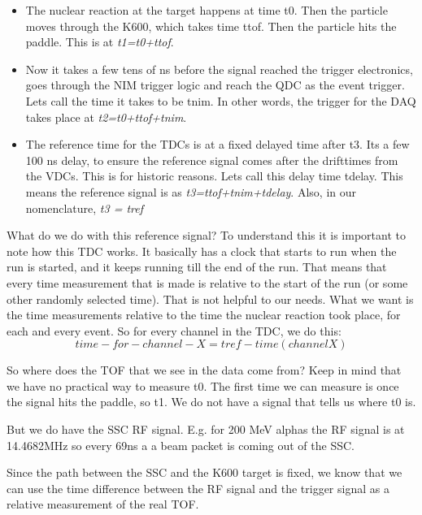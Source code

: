 \documentclass[11pt]{report}
\begin{document}
\begin{itemize}
\item
The nuclear reaction at the target happens at time t0.
Then the particle moves through the K600, which takes time ttof.
Then the particle hits the paddle. This is at 
{\it t1=t0+ttof}.

\item
Now it takes a few tens of ns before the signal reached the trigger
electronics, goes through the NIM trigger logic and reach the QDC as
the event trigger. Lets call the time it takes to be tnim.
In other words, the trigger for the DAQ takes place at
{\it t2=t0+ttof+tnim}.


\item
The reference time for the TDCs is at a fixed delayed time after t3.
Its a few 100 ns delay, to ensure the reference signal comes after the
drifttimes from the VDCs.  This is for historic reasons.
Lets call this delay time tdelay.
This means the reference signal is as 
{\it t3=ttof+tnim+tdelay}.
Also, in our nomenclature, {\it t3 = tref}
\end{itemize}


What do we do with this reference signal?
To understand this it is important to note how this TDC works.
It basically has a clock that starts to run when the run is started,
and it keeps running till the end of the run. That means that every
time measurement that is made is relative to the start of the run (or
some other randomly selected time).
That is not helpful to our needs.
What we want is the time measurements relative to the time the nuclear
reaction took place, for each and every event. 
So for every channel in the TDC, we do this:
\begin{equation}
time-for-channel-X =  tref - time(channelX)
\end{equation}

So where does the TOF that we see in the data come from?
Keep in mind that we have no practical way to measure t0.
The first time we can measure is once the signal hits the paddle, so
t1.   We do not have a signal that tells us where t0 is.

But we do have the SSC RF signal. E.g. for 200 MeV alphas the RF signal
is at 14.4682MHz so every 69ns a a beam packet is coming out of the
SSC.

Since the path between the SSC and the K600 target is fixed, we know
that we can use the time difference between the RF signal and the
trigger signal as a relative measurement of the real TOF.
\end{document}
